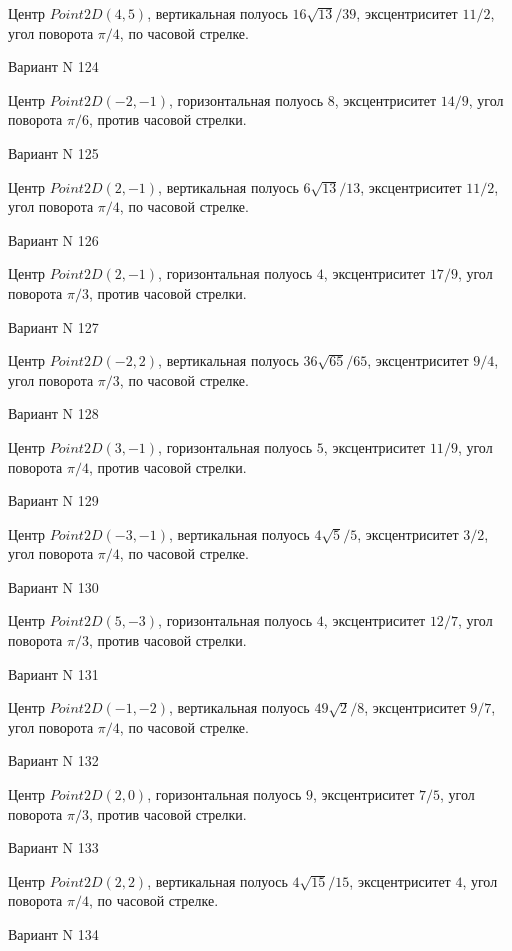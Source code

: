 \documentclass[11pt]{report}
\begin{document}
Центр $Point2D\left(4, 5\right)$, вертикальная полуось $16 \sqrt{13} / 39$, эксцентриситет $11 / 2$, угол поворота $\pi / 4$, по часовой стрелке.

Вариант N 124

Центр $Point2D\left(-2, -1\right)$, горизонтальная полуось $8$, эксцентриситет $14 / 9$, угол поворота $\pi / 6$, против часовой стрелки.

Вариант N 125

Центр $Point2D\left(2, -1\right)$, вертикальная полуось $6 \sqrt{13} / 13$, эксцентриситет $11 / 2$, угол поворота $\pi / 4$, по часовой стрелке.

Вариант N 126

Центр $Point2D\left(2, -1\right)$, горизонтальная полуось $4$, эксцентриситет $17 / 9$, угол поворота $\pi / 3$, против часовой стрелки.

Вариант N 127

Центр $Point2D\left(-2, 2\right)$, вертикальная полуось $36 \sqrt{65} / 65$, эксцентриситет $9 / 4$, угол поворота $\pi / 3$, по часовой стрелке.

Вариант N 128

Центр $Point2D\left(3, -1\right)$, горизонтальная полуось $5$, эксцентриситет $11 / 9$, угол поворота $\pi / 4$, против часовой стрелки.

Вариант N 129

Центр $Point2D\left(-3, -1\right)$, вертикальная полуось $4 \sqrt{5} / 5$, эксцентриситет $3 / 2$, угол поворота $\pi / 4$, по часовой стрелке.

Вариант N 130

Центр $Point2D\left(5, -3\right)$, горизонтальная полуось $4$, эксцентриситет $12 / 7$, угол поворота $\pi / 3$, против часовой стрелки.

Вариант N 131

Центр $Point2D\left(-1, -2\right)$, вертикальная полуось $49 \sqrt{2} / 8$, эксцентриситет $9 / 7$, угол поворота $\pi / 4$, по часовой стрелке.

Вариант N 132

Центр $Point2D\left(2, 0\right)$, горизонтальная полуось $9$, эксцентриситет $7 / 5$, угол поворота $\pi / 3$, против часовой стрелки.

Вариант N 133

Центр $Point2D\left(2, 2\right)$, вертикальная полуось $4 \sqrt{15} / 15$, эксцентриситет $4$, угол поворота $\pi / 4$, по часовой стрелке.

Вариант N 134
\end{document}
